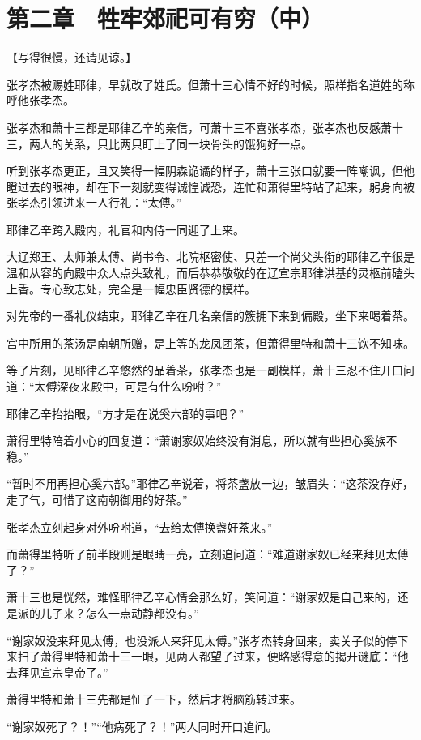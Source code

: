 \section{第二章　牲牢郊祀可有穷（中）}

【写得很慢，还请见谅。】

张孝杰被赐姓耶律，早就改了姓氏。但萧十三心情不好的时候，照样指名道姓的称呼他张孝杰。

张孝杰和萧十三都是耶律乙辛的亲信，可萧十三不喜张孝杰，张孝杰也反感萧十三，两人的关系，只比两只盯上了同一块骨头的饿狗好一点。

听到张孝杰更正，且又笑得一幅阴森诡谲的样子，萧十三张口就要一阵嘲讽，但他瞪过去的眼神，却在下一刻就变得诚惶诚恐，连忙和萧得里特站了起来，躬身向被张孝杰引领进来一人行礼：“太傅。”

耶律乙辛跨入殿内，礼官和内侍一同迎了上来。

大辽郑王、太师兼太傅、尚书令、北院枢密使、只差一个尚父头衔的耶律乙辛很是温和从容的向殿中众人点头致礼，而后恭恭敬敬的在辽宣宗耶律洪基的灵柩前磕头上香。专心致志处，完全是一幅忠臣贤德的模样。

对先帝的一番礼仪结束，耶律乙辛在几名亲信的簇拥下来到偏殿，坐下来喝着茶。

宫中所用的茶汤是南朝所赠，是上等的龙凤团茶，但萧得里特和萧十三饮不知味。

等了片刻，见耶律乙辛悠然的品着茶，张孝杰也是一副模样，萧十三忍不住开口问道：“太傅深夜来殿中，可是有什么吩咐？”

耶律乙辛抬抬眼，“方才是在说奚六部的事吧？”

萧得里特陪着小心的回复道：“萧谢家奴始终没有消息，所以就有些担心奚族不稳。”

“暂时不用再担心奚六部。”耶律乙辛说着，将茶盏放一边，皱眉头：“这茶没存好，走了气，可惜了这南朝御用的好茶。”

张孝杰立刻起身对外吩咐道，“去给太傅换盏好茶来。”

而萧得里特听了前半段则是眼睛一亮，立刻追问道：“难道谢家奴已经来拜见太傅了？”

萧十三也是恍然，难怪耶律乙辛心情会那么好，笑问道：“谢家奴是自己来的，还是派的儿子来？怎么一点动静都没有。”

“谢家奴没来拜见太傅，也没派人来拜见太傅。”张孝杰转身回来，卖关子似的停下来扫了萧得里特和萧十三一眼，见两人都望了过来，便略感得意的揭开谜底：“他去拜见宣宗皇帝了。”

萧得里特和萧十三先都是怔了一下，然后才将脑筋转过来。

“谢家奴死了？！”“他病死了？！”两人同时开口追问。

